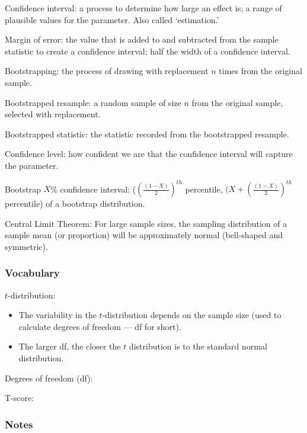 \documentclass[
]{report}
\newcommand{\rgs}{\vspace{12pt}} %
\begin{document}
Confidence interval: a process to determine how large an effect is; a range of plausible values for the parameter. Also called `estimation.'

Margin of error: the value that is added to and subtracted from the sample statistic to create a confidence interval; half the width of a confidence interval.

Bootstrapping: the process of drawing with replacement \(n\) times from the original sample.

Bootstrapped resample: a random sample of size \(n\) from the original sample, selected with replacement.

Bootstrapped statistic: the statistic recorded from the bootstrapped resample.

Confidence level: how confident we are that the confidence interval will capture the parameter.

Bootstrap \(X\)\% confidence interval: (\((\frac{(1-X)}{2})^{th}\) percentile, \((X+(\frac{(1-X)}{2})^{th}\) percentile) of a bootstrap distribution.

Central Limit Theorem: For large sample sizes, the sampling distribution of a sample mean (or proportion) will be approximately normal (bell-shaped and symmetric).

\hypertarget{vocabulary-17}{%
\subsubsection*{Vocabulary}\label{vocabulary-17}}

\(t\)-distribution:
\rgs 

\begin{itemize}
\item
  The variability in the \(t\)-distribution depends on the sample size (used to calculate degrees of freedom --- df for short).
\item
  The larger df, the closer the \(t\) distribution is to the standard normal distribution.
\end{itemize}

Degrees of freedom (df):
\rgs 

T-score:
\rgs 

\hypertarget{notes-22}{%
\subsubsection*{Notes}\label{notes-22}}
\end{document}
